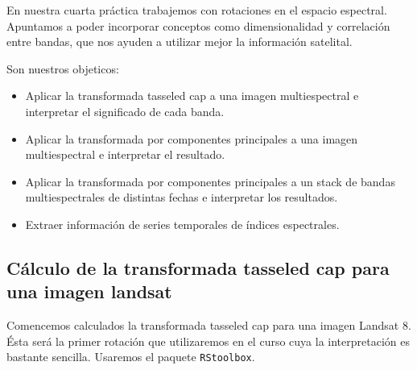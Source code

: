 En nuestra cuarta pr\'actica trabajemos con rotaciones en el espacio espectral.
Apuntamos a poder incorporar conceptos como dimensionalidad y
correlaci\'on entre bandas, que nos ayuden a utilizar mejor la informaci\'on
satelital.

Son nuestros objeticos:

\begin{itemize}
    \item Aplicar la transformada tasseled cap a una imagen multiespectral e
        interpretar el significado de cada banda.
    \item Aplicar la transformada por componentes principales a una imagen
        multiespectral e interpretar el resultado.
    \item Aplicar la transformada por componentes principales a un stack
        de bandas multiespectrales de distintas fechas e interpretar los resultados.
    \item Extraer informaci\'on de series temporales de \'indices espectrales.
\end{itemize}

\subsection{C\'alculo de la transformada tasseled cap para una imagen landsat}

Comencemos calculados la transformada tasseled cap para una imagen Landsat 8. \'Esta
ser\'a la primer rotaci\'on que utilizaremos en el curso cuya la
interpretaci\'on es bastante sencilla. Usaremos el paquete
\texttt{RStoolbox}.

